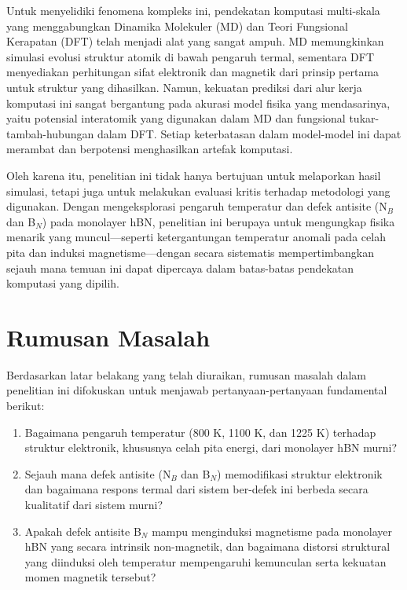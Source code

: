 Untuk menyelidiki fenomena kompleks ini, pendekatan komputasi multi-skala yang menggabungkan Dinamika Molekuler (MD) dan Teori Fungsional Kerapatan (DFT) telah menjadi alat yang sangat ampuh. MD memungkinkan simulasi evolusi struktur atomik di bawah pengaruh termal, sementara DFT menyediakan perhitungan sifat elektronik dan magnetik dari prinsip pertama untuk struktur yang dihasilkan. Namun, kekuatan prediksi dari alur kerja komputasi ini sangat bergantung pada akurasi model fisika yang mendasarinya, yaitu potensial interatomik yang digunakan dalam MD dan fungsional tukar-tambah-hubungan dalam DFT. Setiap keterbatasan dalam model-model ini dapat merambat dan berpotensi menghasilkan artefak komputasi.

Oleh karena itu, penelitian ini tidak hanya bertujuan untuk melaporkan hasil simulasi, tetapi juga untuk melakukan evaluasi kritis terhadap metodologi yang digunakan. Dengan mengeksplorasi pengaruh temperatur dan defek antisite (N$_B$ dan B$_N$) pada monolayer hBN, penelitian ini berupaya untuk mengungkap fisika menarik yang muncul—seperti ketergantungan temperatur anomali pada celah pita dan induksi magnetisme—dengan secara sistematis mempertimbangkan sejauh mana temuan ini dapat dipercaya dalam batas-batas pendekatan komputasi yang dipilih.

\section{Rumusan Masalah}
Berdasarkan latar belakang yang telah diuraikan, rumusan masalah dalam penelitian ini difokuskan untuk menjawab pertanyaan-pertanyaan fundamental berikut:
\begin{enumerate}
    \item Bagaimana pengaruh temperatur (800 K, 1100 K, dan 1225 K) terhadap struktur elektronik, khususnya celah pita energi, dari monolayer hBN murni?
    \item Sejauh mana defek antisite (N$_B$ dan B$_N$) memodifikasi struktur elektronik dan bagaimana respons termal dari sistem ber-defek ini berbeda secara kualitatif dari sistem murni?
    \item Apakah defek antisite B$_N$ mampu menginduksi magnetisme pada monolayer hBN yang secara intrinsik non-magnetik, dan bagaimana distorsi struktural yang diinduksi oleh temperatur mempengaruhi kemunculan serta kekuatan momen magnetik tersebut?
\end{enumerate}


